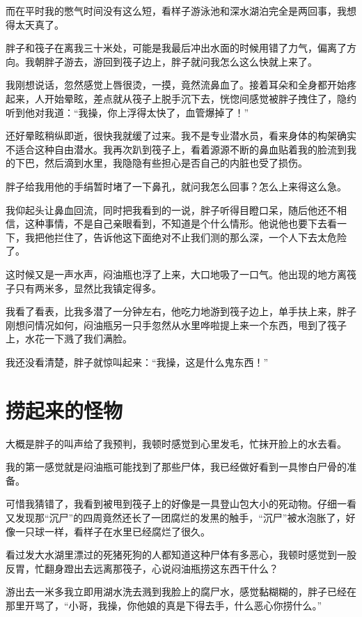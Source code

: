 而在平时我的憋气时间没有这么短，看样子游泳池和深水湖泊完全是两回事，我想得太天真了。

胖子和筏子在离我三十米处，可能是我最后冲出水面的时候用错了力气，偏离了方向。我朝胖子游去，游回到筏子边上，胖子就问我怎么这么快就上来了。

我刚想说话，忽然感觉上唇很烫，一摸，竟然流鼻血了。接着耳朵和全身都开始疼起来，人开始晕眩，差点就从筏子上脱手沉下去，恍惚间感觉被胖子拽住了，隐约听到他对我道：“我操，你上浮得太快了，血管爆掉了！”

还好晕眩稍纵即逝，很快我就缓了过来。我不是专业潜水员，看来身体的构架确实不适合这种自由潜水。我再次趴到筏子上，看着源源不断的鼻血贴着我的脸流到我的下巴，然后滴到水里，我隐隐有些担心是否自己的内脏也受了损伤。

胖子给我用他的手绢暂时堵了一下鼻孔，就问我怎么回事？怎么上来得这么急。

我仰起头让鼻血回流，同时把我看到的一说，胖子听得目瞪口呆，随后他还不相信，这种事情，不是自己亲眼看到，不知道是个什么情形。他说他也要下去看一下，我把他拦住了，告诉他这下面绝对不止我们测的那么深，一个人下去太危险了。

这时候又是一声水声，闷油瓶也浮了上来，大口地吸了一口气。他出现的地方离筏子只有两米多，显然比我镇定得多。

我看了看表，比我多潜了一分钟左右，他吃力地游到筏子边上，单手扶上来，胖子刚想问情况如何，闷油瓶另一只手忽然从水里哗啦提上来一个东西，甩到了筏子上，水花一下溅了我们满脸。

我还没看清楚，胖子就惊叫起来：“我操，这是什么鬼东西！”

\chapter{捞起来的怪物}

大概是胖子的叫声给了我预判，我顿时感觉到心里发毛，忙抹开脸上的水去看。

我的第一感觉就是闷油瓶可能找到了那些尸体，我已经做好看到一具惨白尸骨的准备。

可惜我猜错了，我看到被甩到筏子上的好像是一具登山包大小的死动物。仔细一看又发现那“沉尸”的四周竟然还长了一团腐烂的发黑的触手，“沉尸”被水泡胀了，好像一只球一样，看样子在水里已经腐烂了很久。

看过发大水湖里漂过的死猪死狗的人都知道这种尸体有多恶心，我顿时感觉到一股反胃，忙翻身蹬出去远离那筏子，心说闷油瓶捞这东西干什么？

游出去一米多我立即用湖水洗去溅到我脸上的腐尸水，感觉黏糊糊的，胖子已经在那里开骂了，“小哥，我操，你他娘的真是下得去手，什么恶心你捞什么。”

